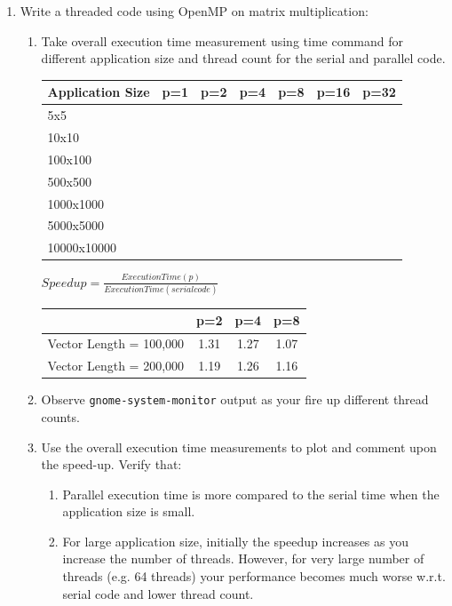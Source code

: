 \documentclass{sem5}
\begin{document}
\begin{enumerate}
\item Write a threaded code using OpenMP on matrix multiplication:
\begin{enumerate}
\item Take overall execution time measurement using time command for different application size and thread count for the serial and parallel code.
\begin{center}
\begin{tabular}{|l|c|c|c|c|c|c|}
\hline
Application Size & p=1 & p=2 & p=4 & p=8 & p=16 & p=32\\
\hline
5x5 & &&&&&\\
\hline
10x10 & &&&&&\\
\hline
100x100 & &&&&&\\
\hline
500x500 & &&&&&\\
\hline
1000x1000 & &&&&&\\
\hline
5000x5000 & &&&&&\\
\hline
10000x10000 & &&&&&\\
\hline
\end{tabular}
\end{center}

\begin{center}
$Speedup = \frac{Execution Time(p)}{Execution Time(serial code)}$
\end{center}

\begin{center}
\begin{tabular}{|c|c|c|c|}

\hline
 & p=2 & p=4 & p=8\\
\hline
Vector Length = 100,000 & 1.31 & 1.27 & 1.07 \\
\hline
Vector Length = 200,000 & 1.19 & 1.26 & 1.16 \\
\hline
\end{tabular}

\end{center}
\item Observe \texttt{gnome-system-monitor} output as your fire up different thread counts.

\item Use the overall execution time measurements to plot and comment upon the speed-up. Verify that:
\begin{enumerate}
\item Parallel execution time is more compared to the serial time when the application size is small.
\item For large application size, initially the speedup increases as you increase the number of threads. However, for very large number of threads (e.g. 64 threads) your performance becomes much worse w.r.t. serial code and lower thread count.


\end{enumerate}
\end{enumerate}
\end{enumerate}
\end{document}
